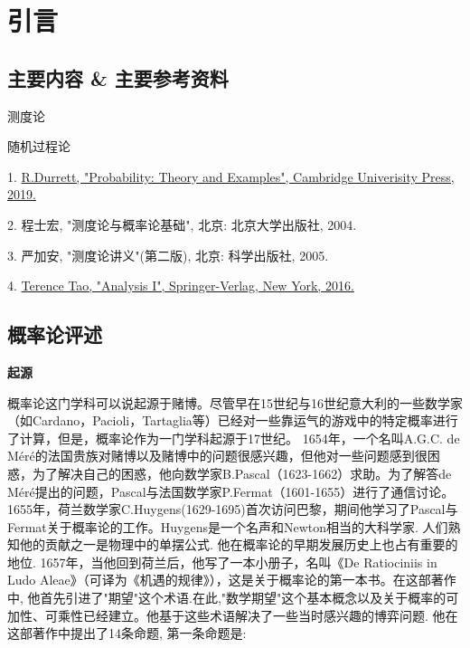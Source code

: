
\setcounter{chapter}{-1}
\chapter{引言}

%
\section{主要内容 \& 主要参考资料}
\begin{blist}
	\item 测度论
	\item 随机过程论
\end{blist}

\begin{blist}\addtolength{\itemsep}{-0.5ex}
	\item[1.] \href{https://services.math.duke.edu/~rtd/PTE/PTE5_011119.pdf}{R.Durrett, "Probability: Theory and Examples", Cambridge Univerisity Press, 2019.}
	\item[2.] 程士宏, "测度论与概率论基础", 北京: 北京大学出版社, 2004.
	\item[3.] 严加安, "测度论讲义"(第二版), 北京: 科学出版社, 2005.
	\item[4.] \href{https://www.springer.com/cn/book/9789811017896}{Terence Tao, "Analysis I", Springer-Verlag, New York, 2016.}
\end{blist}

\section{概率论评述}

\textbf{起源}

概率论这门学科可以说起源于赌博。尽管早在15世纪与16世纪意大利的一些数学家（如Cardano，Pacioli，Tartaglia等）已经对一些靠运气的游戏中的特定概率进行了计算，但是，概率论作为一门学科起源于17世纪。
1654年，一个名叫A.G.C. de Méré的法国贵族对赌博以及赌博中的问题很感兴趣，但他对一些问题感到很困惑，为了解决自己的困惑，他向数学家B.Pascal（1623-1662）求助。为了解答de Méré提出的问题，Pascal与法国数学家P.Fermat（1601-1655）进行了通信讨论。1655年，荷兰数学家C.Huygens(1629-1695)首次访问巴黎，期间他学习了Pascal与Fermat关于概率论的工作。Huygens是一个名声和Newton相当的大科学家. 人们熟知他的贡献之一是物理中的单摆公式. 他在概率论的早期发展历史上也占有重要的地位. 1657年，当他回到荷兰后，他写了一本小册子，名叫《De Ratiociniis in Ludo Aleae》（可译为《机遇的规律》），这是关于概率论的第一本书。在这部著作中, 他首先引进了"期望"这个术语.在此,"数学期望"这个基本概念以及关于概率的可加性、可乘性已经建立。他基于这些术语解决了一些当时感兴趣的博弈问题. 他在这部著作中提出了14条命题, 第一条命题是:

